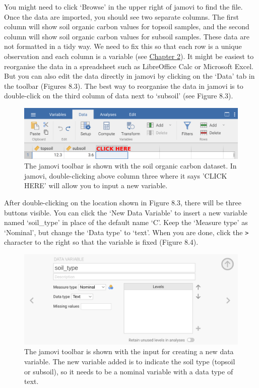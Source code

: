\documentclass[
  openany]{krantz}
\begin{document}
You might need to click `Browse' in the upper right of jamovi to find the file.
Once the data are imported, you should see two separate columns.
The first column will show soil organic carbon values for topsoil samples, and the second column will show soil organic carbon values for subsoil samples.
These data are not formatted in a tidy way.
We need to fix this so that each row is a unique observation and each column is a variable (see \protect\hyperlink{Chapter_2}{Chapter 2}).
It might be easiest to reorganise the data in a spreadsheet such as LibreOffice Calc or Microsoft Excel.
But you can also edit the data directly in jamovi by clicking on the `Data' tab in the toolbar (Figures 8.3).
The best way to reorganise the data in jamovi is to double-click on the third column of data next to `subsoil' (see Figure 8.3).

\begin{figure}
\includegraphics[width=1\linewidth]{img/jamovi_new_variable} \caption{The jamovi toolbar is shown with the soil organic carbon dataset. In jamovi, double-clicking above column three where it says 'CLICK HERE' will allow you to input a new variable.}\label{fig:unnamed-chunk-26}
\end{figure}

After double-clicking on the location shown in Figure 8.3, there will be three buttons visible.
You can click the `New Data Variable' to insert a new variable named `soil\_type' in place of the default name `C'.
Keep the `Measure type' as `Nominal', but change the `Data type' to `text'.
When you are done, click the \texttt{\textgreater{}} character to the right so that the variable is fixed (Figure 8.4).

\begin{figure}
\includegraphics[width=1\linewidth]{img/jamovi_set_variable} \caption{The jamovi toolbar is shown with the input for creating a new data variable. The new variable added is to indicate the soil type (topsoil or subsoil), so it needs to be a nominal variable with a data type of text.}\label{fig:unnamed-chunk-27}
\end{figure}
\end{document}
